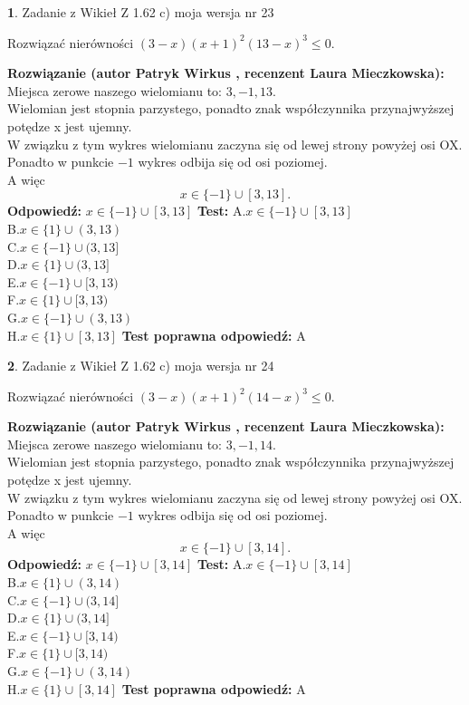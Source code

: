 \documentclass[12pt, a4paper]{article}
\theoremstyle{definition} %
\newtheorem{zad}{}
\newcommand{\zadStart}[1]{\begin{zad}#1\newline}
\newcommand{\zadStop}{\end{zad}}
\newcommand{\rozwStart}[2]{\noindent \textbf{Rozwiązanie (autor #1 , recenzent #2): }\newline}
\newcommand{\rozwStop}{\newline}
\newcommand{\odpStart}{\noindent \textbf{Odpowiedź:}\newline}
\newcommand{\odpStop}{\newline}
\newcommand{\testStart}{\noindent \textbf{Test:}\newline}
\newcommand{\testStop}{\newline}
\newcommand{\kluczStart}{\noindent \textbf{Test poprawna odpowiedź:}\newline}
\newcommand{\kluczStop}{\newline}
\begin{document}
\zadStart{Zadanie z Wikieł Z 1.62 c) moja wersja nr 23}

Rozwiązać nierówności $(3-x)(x+1)^{2}(13-x)^{3}\le0$.
\zadStop
\rozwStart{Patryk Wirkus}{Laura Mieczkowska}
Miejsca zerowe naszego wielomianu to: $3, -1, 13$.\\
Wielomian jest stopnia parzystego, ponadto znak współczynnika przy\linebreak najwyższej potędze x jest ujemny.\\ W związku z tym wykres wielomianu zaczyna się od lewej strony powyżej osi OX.\\
Ponadto w punkcie $-1$ wykres odbija się od osi poziomej.\\
A więc $$x \in \{-1\} \cup [3,13].$$
\rozwStop
\odpStart
$x \in \{-1\} \cup [3,13]$
\odpStop
\testStart
A.$x \in \{-1\} \cup [3,13]$\\
B.$x \in \{1\} \cup (3,13)$\\
C.$x \in \{-1\} \cup (3,13]$\\
D.$x \in \{1\} \cup (3,13]$\\
E.$x \in \{-1\} \cup [3,13)$\\
F.$x \in \{1\} \cup [3,13)$\\
G.$x \in \{-1\} \cup (3,13)$\\
H.$x \in \{1\} \cup [3,13]$
\testStop
\kluczStart
A
\kluczStop



\zadStart{Zadanie z Wikieł Z 1.62 c) moja wersja nr 24}

Rozwiązać nierówności $(3-x)(x+1)^{2}(14-x)^{3}\le0$.
\zadStop
\rozwStart{Patryk Wirkus}{Laura Mieczkowska}
Miejsca zerowe naszego wielomianu to: $3, -1, 14$.\\
Wielomian jest stopnia parzystego, ponadto znak współczynnika przy\linebreak najwyższej potędze x jest ujemny.\\ W związku z tym wykres wielomianu zaczyna się od lewej strony powyżej osi OX.\\
Ponadto w punkcie $-1$ wykres odbija się od osi poziomej.\\
A więc $$x \in \{-1\} \cup [3,14].$$
\rozwStop
\odpStart
$x \in \{-1\} \cup [3,14]$
\odpStop
\testStart
A.$x \in \{-1\} \cup [3,14]$\\
B.$x \in \{1\} \cup (3,14)$\\
C.$x \in \{-1\} \cup (3,14]$\\
D.$x \in \{1\} \cup (3,14]$\\
E.$x \in \{-1\} \cup [3,14)$\\
F.$x \in \{1\} \cup [3,14)$\\
G.$x \in \{-1\} \cup (3,14)$\\
H.$x \in \{1\} \cup [3,14]$
\testStop
\kluczStart
A
\kluczStop
\end{document}
